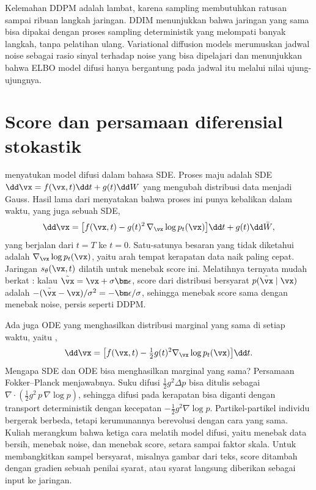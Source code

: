 Kelemahan DDPM adalah lambat, karena sampling membutuhkan ratusan sampai ribuan langkah jaringan.
DDIM \citep{song2021ddim} menunjukkan bahwa jaringan yang sama bisa dipakai dengan proses sampling
deterministik yang melompati banyak langkah, tanpa pelatihan ulang. Variational diffusion models
\citep{kingma2021} merumuskan jadwal noise sebagai rasio sinyal terhadap noise yang bisa dipelajari dan
menunjukkan bahwa ELBO model difusi hanya bergantung pada jadwal itu melalui nilai ujung-ujungnya.

\section{Score dan persamaan diferensial stokastik}

\citet{song2021} menyatukan model difusi dalam bahasa SDE. Proses maju adalah SDE
$\dd\vx=f(\vx,t)\dd t+g(t)\dd W$ yang mengubah distribusi data menjadi Gauss. Hasil lama dari
\citet{anderson1982} menyatakan bahwa proses ini punya kebalikan dalam waktu, yang juga sebuah SDE,
\begin{equation}
\dd\vx=\big[f(\vx,t)-g(t)^2\,\nabla_{\vx}\log p_t(\vx)\big]\dd t+g(t)\dd\bar W,
\end{equation}
yang berjalan dari $t=T$ ke $t=0$. Satu-satunya besaran yang tidak diketahui adalah 
$\nabla_{\vx}\log p_t(\vx)$, yaitu arah tempat kerapatan data naik paling cepat. Jaringan
$s_\theta(\vx,t)$ dilatih untuk menebak score ini. Melatihnya ternyata mudah berkat
 \citep{vincent2011}: kalau $\tilde\vx=\vx+\sigma\bm\epsilon$, score
dari distribusi bersyarat $p(\tilde\vx\mid\vx)$ adalah $-(\tilde\vx-\vx)/\sigma^2=-\bm\epsilon/\sigma$,
sehingga menebak score sama dengan menebak noise, persis seperti DDPM.

Ada juga ODE yang menghasilkan distribusi marginal yang sama di setiap waktu, yaitu
,
\begin{equation}
\dd\vx=\big[f(\vx,t)-\tfrac12g(t)^2\nabla_{\vx}\log p_t(\vx)\big]\dd t.
\end{equation}
Mengapa SDE dan ODE bisa menghasilkan marginal yang sama? Persamaan Fokker--Planck menjawabnya.
Suku difusi $\tfrac12g^2\Delta p$ bisa ditulis sebagai $\nabla\cdot(\tfrac12g^2\,p\,\nabla\log p)$,
sehingga difusi pada kerapatan bisa diganti dengan transport deterministik dengan kecepatan
$-\tfrac12g^2\nabla\log p$. Partikel-partikel individu bergerak berbeda, tetapi kerumunannya
berevolusi dengan cara yang sama. Kuliah merangkum bahwa ketiga cara melatih model difusi, yaitu
menebak data bersih, menebak noise, dan menebak score, setara sampai faktor skala. Untuk
membangkitkan sampel bersyarat, misalnya gambar dari teks, score ditambah dengan gradien sebuah
penilai syarat, atau syarat langsung diberikan sebagai input ke jaringan.

